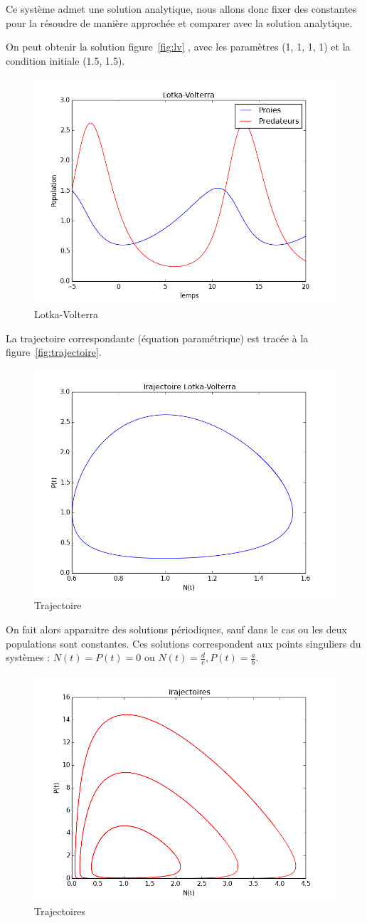 Ce système admet une solution analytique, nous allons donc fixer des constantes pour la résoudre de manière approchée et comparer avec la solution analytique.

On peut obtenir la solution figure~\vref{fig:lv}
, avec les paramètres (1, 1, 1, 1) et la condition initiale (1.5, 1.5).

\begin{figure}
\centering
\includegraphics[width=.3\textwidth]{lotkavolterra}

\caption{Lotka-Volterra}
\label{fig:lv}
\end{figure}

La trajectoire correspondante (équation paramétrique) est tracée à la figure~\vref{fig:trajectoire}.

\begin{figure}
\centering
\includegraphics[width=.3\textwidth]{trajectoire}

\caption{Trajectoire}
\label{fig:trajectoire}
\end{figure}

On fait alors apparaitre des solutions périodiques, sauf dans le cas ou les deux populations sont constantes. Ces solutions correspondent aux points singuliers du systèmes : $N(t) = P(t) = 0$ ou $N(t) = \frac{d}{c}, P(t) = \frac{a}{b}$.

\begin{figure}
\centering
\includegraphics[width=.3\textwidth]{trajectoires}

\caption{Trajectoires}
\label{fig:trajectoires}
\end{figure}
